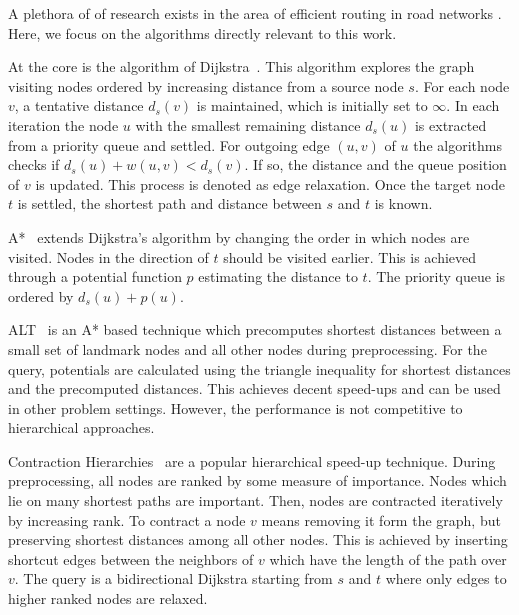 \documentclass[a4paper,UKenglish,cleveref, autoref]{lipics-v2019}
\begin{document}


A plethora of of research exists in the area of efficient routing in road networks \cite{bdgmpsww-rptn-16}.
Here, we focus on the algorithms directly relevant to this work.

At the core is the algorithm of Dijkstra~\cite{d-ntpcg-59}.
This algorithm explores the graph visiting nodes ordered by increasing distance from a source node $s$.
For each node $v$, a tentative distance $d_s(v)$ is maintained, which is initially set to $\infty$.
In each iteration the node $u$ with the smallest remaining distance $d_s(u)$ is extracted from a priority queue and settled.
For outgoing edge $(u,v)$ of $u$ the algorithms checks if $d_s(u) + w(u,v) < d_s(v)$.
If so, the distance and the queue position of $v$ is updated.
This process is denoted as edge relaxation.
Once the target node $t$ is settled, the shortest path and distance between $s$ and $t$ is known.

A*~\cite{hnr-afbhd-68} extends Dijkstra's algorithm by changing the order in which nodes are visited.
Nodes in the direction of $t$ should be visited earlier.
This is achieved through a potential function $p$ estimating the distance to $t$.
The priority queue is ordered by $d_s(u) + p(u)$.

ALT~\cite{gh-cspas-05} is an A* based technique which precomputes shortest distances between a small set of landmark nodes and all other nodes during preprocessing.
For the query, potentials are calculated using the triangle inequality for shortest distances and the precomputed distances.
This achieves decent speed-ups and can be used in other problem settings.
However, the performance is not competitive to hierarchical approaches.

Contraction Hierarchies~\cite{gssv-erlrn-12} are a popular hierarchical speed-up technique.
During preprocessing, all nodes are ranked by some measure of importance.
Nodes which lie on many shortest paths are important.
Then, nodes are contracted iteratively by increasing rank.
To contract a node $v$ means removing it form the graph, but preserving shortest distances among all other nodes.
This is achieved by inserting shortcut edges between the neighbors of $v$ which have the length of the path over $v$.
The query is a bidirectional Dijkstra starting from $s$ and $t$ where only edges to higher ranked nodes are relaxed.
\end{document}
